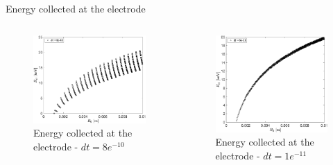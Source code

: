 \documentclass[aspectratio=169,xcolor=dvipsnames,8pt]{beamer}
\begin{document}
\begin{frame}{Energy collected at the electrode}
     \begin{columns}[c] %

		\begin{figure}[h!]
		\includegraphics[width=1 \textwidth]{E(R0)_9.eps}
		\caption{\label{config} Energy collected at the electrode - $dt = 8e^{-10}$}
		\end{figure}

		\begin{figure}[h!]
		\includegraphics[width=1 \textwidth]{E(R0)_11.eps}
		\caption{\label{config} Energy collected at the electrode - $dt = 1e^{-11}$}
		\end{figure}
     \end{columns}
\end{frame}
\end{document}
